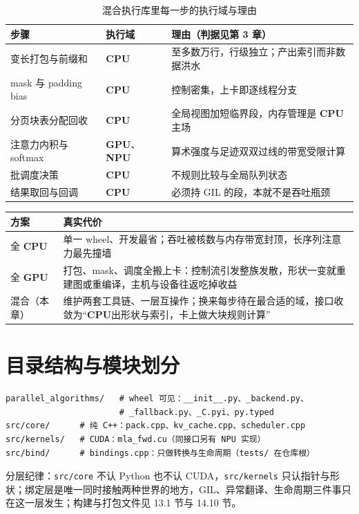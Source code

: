 \documentclass[12pt,a4paper,fontset=fandol]{ctexbook}
\newcommand{\Tp}[1]{\texttt{#1}}
\newcommand{\Dom}[1]{\textsf{\bfseries #1}}
\newcommand{\CPU}{\Dom{CPU}}
\newcommand{\GPU}{\Dom{GPU}}
\newcommand{\NPU}{\Dom{NPU}}
\begin{document}
\begin{table}[htbp]
\centering
\caption{混合执行库里每一步的执行域与理由}
\begin{tabular}{@{}>{\raggedright\arraybackslash}p{}
  >{\raggedright\arraybackslash}p{}
  >{\raggedright\arraybackslash}p{}@{}}
\toprule
步骤 & 执行域 & 理由（判据见第 3 章） \\
\midrule
变长打包与前缀和 & \CPU{} & 至多数万行，行级独立；产出索引而非数据洪水 \\
mask 与 padding bias & \CPU{} & 控制密集，上卡即逐线程分支 \\
分页块表分配回收 & \CPU{} & 全局视图加短临界段，内存管理是 \CPU{}主场 \\
注意力内积与 softmax & \GPU{}、\NPU{} & 算术强度与足迹双双过线的带宽受限计算 \\
批调度决策 & \CPU{} & 不规则比较与全局队列状态 \\
结果取回与回调 & \CPU{} & 必须持 GIL 的段，本就不是吞吐瓶颈 \\
\bottomrule
\end{tabular}
\label{tab:domain-split}
\end{table}

\begin{compare}[title={全 \CPU{}、全 \GPU{}、混合三种方案的真实代价}]
\begin{tabular}{@{}>{\raggedright\arraybackslash}p{}
  >{\raggedright\arraybackslash}p{}@{}}
方案 & 真实代价 \\
\midrule
全 \CPU{} & 单一 wheel、开发最省；吞吐被核数与内存带宽封顶，长序列注意力最先撞墙 \\
全 \GPU{} & 打包、mask、调度全搬上卡：控制流引发整族发散，形状一变就重建图或重编译，主机与设备往返吃掉收益 \\
混合（本章） & 维护两套工具链、一层互操作；换来每步待在最合适的域，接口收敛为``\CPU{}出形状与索引，卡上做大块规则计算'' \\
\end{tabular}
\end{compare}

\section{目录结构与模块划分}

\begin{lstlisting}[style=shellstyle,caption={仓库骨架：四层各司其职}]
parallel_algorithms/   # wheel 可见：__init__.py、_backend.py、
                       # _fallback.py、_C.pyi、py.typed
src/core/      # 纯 C++：pack.cpp、kv_cache.cpp、scheduler.cpp
src/kernels/   # CUDA：mla_fwd.cu（同接口另有 NPU 实现）
src/bind/      # bindings.cpp：只做转换与生命周期（tests/ 在仓库根）
\end{lstlisting}
分层纪律：\Tp{src/core} 不认 Python 也不认 CUDA，\Tp{src/kernels} 只认指针与形状；绑定层是唯一同时接触两种世界的地方，GIL、异常翻译、生命周期三件事只在这一层发生；构建与打包文件见 13.1 节与 14.10 节。
\end{document}
